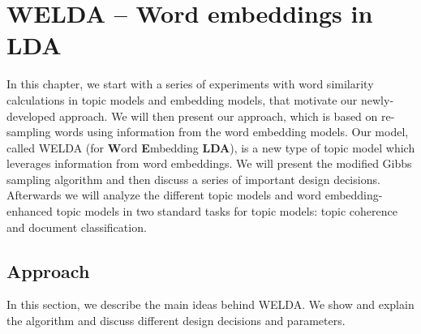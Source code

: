 \documentclass[
        a4paper,
        titlepage,
        twoside,
        parskip,
        numbers=noenddot
        ]{scrbook}
\theoremstyle{break}
\begin{document}


\chapter{WELDA -- Word embeddings in LDA}
\label{sec:welda}

In this chapter, we start with a series of experiments with word similarity calculations in topic models and embedding models, that motivate our newly-developed approach.
We will then present our approach, which is based on re-sampling words using information from the word embedding models.
Our model, called WELDA (for \textbf{W}ord \textbf{E}mbedding \textbf{LDA}), is a new type of topic model which leverages information from word embeddings.
We will present the modified Gibbs sampling algorithm and then discuss a series of important design decisions.
Afterwards we will analyze the different topic models and word embedding-enhanced topic models in two standard tasks for topic models: topic coherence and document classification.

\section{Approach}
In this section, we describe the main ideas behind WELDA.
We show and explain the algorithm and discuss different design decisions and parameters.
\end{document}

